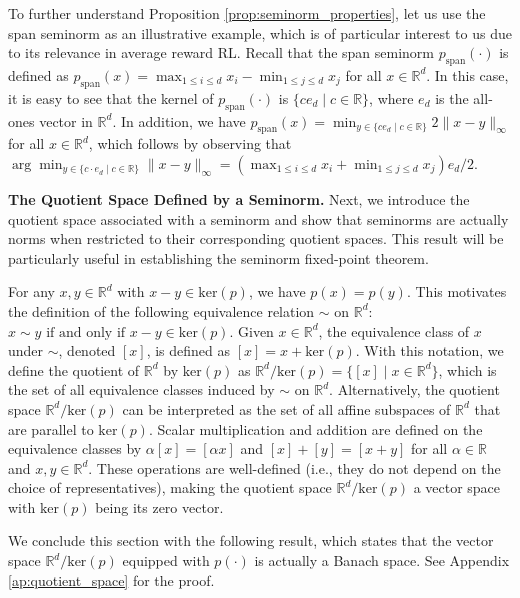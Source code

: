\documentclass[11 pt]{article}
\begin{document}
	To further understand Proposition \ref{prop:seminorm_properties}, let us use the span seminorm as an illustrative example, which is of particular interest to us due to its relevance in average reward RL. 
	Recall that the span seminorm $p_\text{span}(\cdot)$ is defined as $p_\text{span}(x)= \max_{1\leq i\leq d} x_i - \min_{1\leq j\leq d} x_j$ for all $x \in \mathbb{R}^d$. In this case, it is easy to see that the kernel of $p_\text{span}(\cdot)$ is $\{c  e_d \mid c \in \mathbb{R}\}$, where $e_d$ is the all-ones vector in $\mathbb{R}^d$. In addition, we have $p_{\text{span}}(x) = \min_{y \in \{c  e_d \mid c \in \mathbb{R}\}} 2\| x - y\|_\infty$ for all $x \in \mathbb{R}^d$,
	which follows by observing that $\arg\min_{y \in \{c \cdot e_d \mid c \in \mathbb{R}\}} \|x - y\|_\infty=(\max_{1\leq i\leq d} x_i + \min_{1\leq j\leq d} x_j)e_d/2$.
	
	\vspace{3 mm}
	\noindent\textbf{The Quotient Space Defined by a Seminorm.} 
	Next, we introduce the quotient space associated with a seminorm and show that seminorms are actually norms when restricted to their corresponding quotient spaces. This result will be particularly useful in establishing the seminorm fixed-point theorem.
	
	For any $x, y \in \mathbb{R}^d$ with $x - y \in \text{ker}(p)$, we have $p(x) = p(y)$. This motivates the definition of the following equivalence relation $\sim$ on $\mathbb{R}^d$: $x \sim y \text{ if and only if } x - y \in \text{ker}(p)$. Given $x \in \mathbb{R}^d$, the equivalence class of $x$ under $\sim$, denoted $[x]$, is defined as $[x] = x + \text{ker}(p)$. With this notation, we define the quotient of $\mathbb{R}^d$ by $\text{ker}(p)$ as $\mathbb{R}^d / \text{ker}(p) = \{[x] \mid x \in \mathbb{R}^d\}$, which is the set of all equivalence classes induced by $\sim$ on $\mathbb{R}^d$. Alternatively, the quotient space $\mathbb{R}^d / \text{ker}(p)$ can be interpreted as the set of all affine subspaces of $\mathbb{R}^d$ that are parallel to $\text{ker}(p)$. Scalar multiplication and addition are defined on the equivalence classes by $\alpha [x] = [\alpha x]$ and $[x] + [y] = [x + y]$ for all $\alpha \in \mathbb{R}$ and $x, y \in \mathbb{R}^d$. These operations are well-defined (i.e., they do not depend on the choice of representatives), making the quotient space $\mathbb{R}^d / \text{ker}(p)$ a vector space with $\text{ker}(p)$ being its zero vector.
	
	We conclude this section with the following result, which states that the vector space $\mathbb{R}^d / \text{ker}(p)$ equipped with $p(\cdot)$ is actually a Banach space.  See Appendix \ref{ap:quotient_space} for the proof.
	
\end{document}
